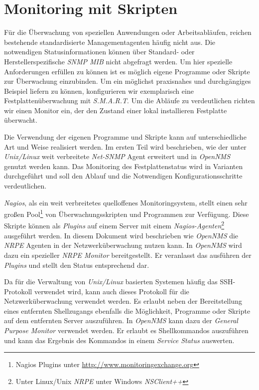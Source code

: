 \section{Monitoring mit Skripten}
Für die Überwachung von speziellen Anwendungen oder Arbeitsabläufen, reichen bestehende standardisierte Managementagenten häufig nicht aus. Die notwendigen Statusinformationen können über Standard- oder Herstellerspezifische \emph{SNMP MIB} nicht abgefragt werden. Um hier spezielle Anforderungen erfüllen zu können ist es möglich eigene Programme oder Skripte zur Überwachung einzubinden. Um ein möglichst praxisnahes und durchgängiges Beispiel liefern zu können, konfigurieren wir exemplarisch eine Festplattenüberwachung mit \emph{S.M.A.R.T}. Um die Abläufe zu verdeutlichen richten wir einen  Monitor ein, der den Zustand einer lokal installieren Festplatte überwacht.

Die Verwendung der eigenen Programme und Skripte kann auf unterschiedliche Art und Weise realisiert werden. Im ersten Teil wird beschrieben, wie der unter \emph{Unix/Linux} weit verbreitete \emph{Net-SNMP} Agent erweitert und in \emph{OpenNMS} genutzt werden kann. Das Monitoring des Festplattenstatus wird in Varianten durchgeführt und soll den Ablauf und die Notwendigen Konfigurationsschritte verdeutlichen.

\emph{Nagios}, als ein weit verbreitetes quelloffenes Monitoringsystem, stellt einen sehr großen Pool\footnote{Nagios Plugins unter \url{http://www.monitoringexchange.org}} von Überwachungsskripten und Programmen zur Verfügung. Diese Skripte können als \emph{Plugins} auf einem Server mit einem \emph{Nagios-Agenten}\footnote{Unter Linux/Unix \emph{NRPE} unter Windows \emph{NSClient++}} ausgeführt werden. In diesem Dokument wird beschrieben wie \emph{OpenNMS} die \emph{NRPE} Agenten in der Netzwerküberwachung nutzen kann. In \emph{OpenNMS} wird dazu ein spezieller \emph{NRPE Monitor} bereitgestellt. Er veranlasst das ausführen der \emph{Plugins} und stellt den Status entsprechend dar.

Da für die Verwaltung von \emph{Unix/Linux} basierten Systemen häufig das SSH-Protokoll verwendet wird, kann auch dieses Protokoll für die Netzwerküberwachung verwendet werden. Es erlaubt neben der Bereitstellung eines entfernten Shellzugangs ebenfalls die Möglichkeit, Programme oder Skripte auf dem entfernten Server auszuführen. In \emph{OpenNMS} kann dazu der \emph{General Purpose Monitor} verwendet werden. Er erlaubt es Shellkommandos auszuführen und kann das Ergebnis des Kommandos in einem \emph{Service Status} auswerten.

